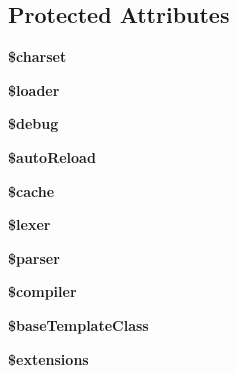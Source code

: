 \subsection*{Protected Attributes}
\begin{DoxyCompactItemize}
\item 
{\bfseries \$charset}\hypertarget{classTwig__Environment_ad5ff98327c93b0f4d6959a44db3e0d07}{}\label{classTwig__Environment_ad5ff98327c93b0f4d6959a44db3e0d07}

\item 
{\bfseries \$loader}\hypertarget{classTwig__Environment_afbab51c885ab989d03abbc8472cf21ea}{}\label{classTwig__Environment_afbab51c885ab989d03abbc8472cf21ea}

\item 
{\bfseries \$debug}\hypertarget{classTwig__Environment_a02bc5328b70c268ac39c5efb9a5c3699}{}\label{classTwig__Environment_a02bc5328b70c268ac39c5efb9a5c3699}

\item 
{\bfseries \$auto\+Reload}\hypertarget{classTwig__Environment_a152e2612abb9a353a3fcc23d1426324e}{}\label{classTwig__Environment_a152e2612abb9a353a3fcc23d1426324e}

\item 
{\bfseries \$cache}\hypertarget{classTwig__Environment_a381d93dffe1b67569926d236b7589805}{}\label{classTwig__Environment_a381d93dffe1b67569926d236b7589805}

\item 
{\bfseries \$lexer}\hypertarget{classTwig__Environment_ac42c1dd0a35c12be89caf794b7f160cc}{}\label{classTwig__Environment_ac42c1dd0a35c12be89caf794b7f160cc}

\item 
{\bfseries \$parser}\hypertarget{classTwig__Environment_a9d8756d3e235e98196a17da6845e4261}{}\label{classTwig__Environment_a9d8756d3e235e98196a17da6845e4261}

\item 
{\bfseries \$compiler}\hypertarget{classTwig__Environment_a171760a92e1fc2c5239272e5816624dd}{}\label{classTwig__Environment_a171760a92e1fc2c5239272e5816624dd}

\item 
{\bfseries \$base\+Template\+Class}\hypertarget{classTwig__Environment_a0d5afb31b54be09c7240b96747b5a846}{}\label{classTwig__Environment_a0d5afb31b54be09c7240b96747b5a846}

\item 
{\bfseries \$extensions}\hypertarget{classTwig__Environment_a36e39bdd5db565e631ecc0a95ca4be4a}{}\label{classTwig__Environment_a36e39bdd5db565e631ecc0a95ca4be4a}


\end{DoxyCompactItemize}
